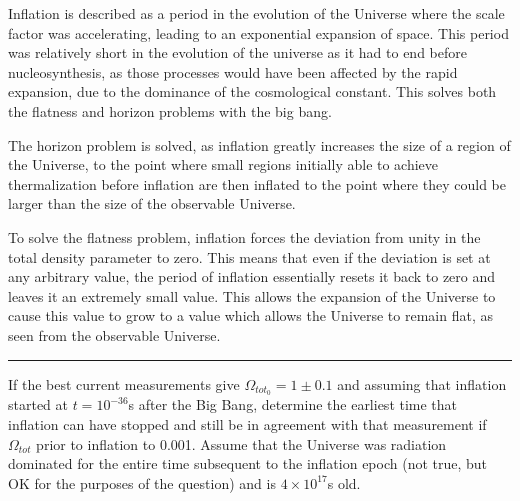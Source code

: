 \documentclass[11pt, a4paper, answers]{exam}
\begin{document}
\begin{questions}
\begin{solution}
        Inflation is described as a period in the evolution of the Universe where the scale factor
        was accelerating, leading to an exponential expansion of space. This period was relatively
        short in the evolution of the universe as it had to end before nucleosynthesis, as those
        processes would have been affected by the rapid expansion, due to the dominance of the
        cosmological constant.  This solves both the flatness and horizon problems with the big
        bang.

        The horizon problem is solved, as inflation greatly increases the size of a region of the
        Universe, to the point where small regions initially able to achieve thermalization before
        inflation are then inflated to the point where they could be larger than the size of the
        observable Universe.

        To solve the flatness problem, inflation forces the deviation from
        unity in the total density parameter to zero. This means that even if the deviation is set
        at any arbitrary value, the period of inflation essentially resets it back to zero and
        leaves it an extremely small value. This allows the expansion of the Universe to cause this
        value to grow to a value which allows the Universe to remain flat, as seen from the
        observable Universe.

    \end{solution}

    \begin{center}
        \rule{8cm}{0.4pt}
    \end{center}
    \newpage


    \question If the best current measurements give $\Omega_{tot_0}=1\pm 0.1$ and assuming that
    inflation started at $t = 10^{-36}$s after the Big Bang, determine the earliest time that
    inflation can have stopped and still be in agreement with that measurement if $\Omega_{tot}$
    prior to inflation to 0.001. Assume that the Universe was radiation dominated for the entire
    time subsequent to the inflation epoch (not true, but OK for the purposes of the question) and
    is $4\times10^{17}$s old.


\end{questions}
\end{document}
